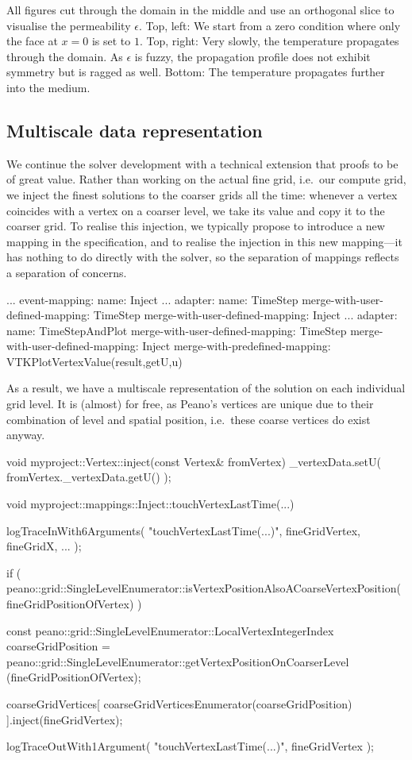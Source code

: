 All figures cut through the domain in the middle and use an orthogonal slice to
visualise the permeability $\epsilon$.
Top, left: We start from a zero condition where only the face at $x=0$ is set to
$1$.
Top, right: Very slowly, the temperature propagates through the domain. As
$\epsilon $ is fuzzy, the propagation profile does not exhibit symmetry but is
ragged as well.
Bottom: The temperature propagates further into the medium.


\subsection{Multiscale data representation}

We continue the solver development with a technical extension that proofs to be
of great value.
Rather than working on the actual fine grid, i.e.~our compute grid, we inject
the finest solutions to the coarser grids all the time:
whenever a vertex coincides with a vertex on a coarser level, we take its value
and copy it to the coarser grid.
To realise this injection, we typically propose to introduce a new mapping in
the specification, and to realise the injection in this new mapping---it has
nothing to do directly with the solver, so the separation of mappings reflects a
separation of concerns.

\begin{code}
...
event-mapping:
  name: Inject
...
adapter:
  name: TimeStep
  merge-with-user-defined-mapping: TimeStep
  merge-with-user-defined-mapping: Inject
...
adapter:
  name: TimeStepAndPlot
  merge-with-user-defined-mapping: TimeStep
  merge-with-user-defined-mapping: Inject
  merge-with-predefined-mapping: VTKPlotVertexValue(result,getU,u)
\end{code}


\noindent
As a result, we have a multiscale representation of the solution on each
individual grid level.
It is (almost) for free, as Peano's vertices are unique due to their combination
of level and spatial position, i.e.~these coarse vertices do exist anyway.

\begin{code}
void myproject::Vertex::inject(const Vertex& fromVertex) {
  _vertexData.setU( fromVertex._vertexData.getU() );
}

void myproject::mappings::Inject::touchVertexLastTime(...) {
 logTraceInWith6Arguments( "touchVertexLastTime(...)", fineGridVertex, fineGridX, ... );

 if ( peano::grid::SingleLevelEnumerator::isVertexPositionAlsoACoarseVertexPosition(
  fineGridPositionOfVertex) ) {
  const peano::grid::SingleLevelEnumerator::LocalVertexIntegerIndex coarseGridPosition = 
   peano::grid::SingleLevelEnumerator::getVertexPositionOnCoarserLevel
   (fineGridPositionOfVertex);

  coarseGridVertices[ coarseGridVerticesEnumerator(coarseGridPosition) ].inject(fineGridVertex);
 }

 logTraceOutWith1Argument( "touchVertexLastTime(...)", fineGridVertex );
}
\end{code}

